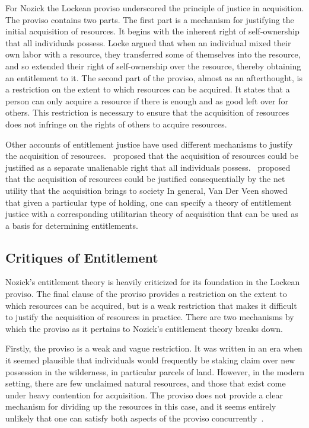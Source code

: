 For Nozick the Lockean proviso underscored the principle of justice in
acquisition. The proviso contains two parts. The first part is a mechanism for 
justifying the initial acquisition of resources. It begins with the inherent 
right of self-ownership that all individuals possess. Locke argued that when 
an individual mixed their own labor with a resource, they transferred some of 
themselves into the resource, and so extended their right of self-ownership over 
the resource, thereby obtaining an entitlement to it. The second part of the
proviso, almost as an afterthought, is a restriction on the extent to which 
resources can be acquired. It states that a person can only acquire a resource
if there is enough and as good left over for others. This restriction is
necessary to ensure that the acquisition of resources does not infringe on the
rights of others to acquire resources.

Other accounts of entitlement justice have used different mechanisms to justify
the acquisition of resources.~\citep{Mack_1990} proposed that the acquisition of
resources could be justified as a separate unalienable right that all
individuals possess.~\citep{Van_der_Veen_1985} proposed that the acquisition of
resources could be justified consequentially by the net utility that the
acquisition brings to society In general, Van Der Veen showed that given a
particular type of holding, one can specify a theory of entitlement justice with
a corresponding utilitarian theory of acquisition that can be used as a basis
for determining entitlements.

\subsection{Critiques of Entitlement}

Nozick's entitlement theory is heavily criticized for its foundation in the
Lockean proviso. The final clause of the proviso provides a restriction on the
extent to which resources can be acquired, but is a weak restriction that makes
it difficult to justify the acquisition of resources in practice. There are two 
mechanisms by which the proviso as it pertains to Nozick's entitlement theory 
breaks down.

Firstly, the proviso is a weak and vague restriction. It was written in an era 
when it seemed plausible that individuals would frequently be staking claim over
new possession in the wilderness, in particular parcels of land. However, in the
modern setting, there are few unclaimed natural resources, and those that exist
come under heavy contention for acquisition. The proviso does not provide a
clear mechanism for dividing up the resources in this case, and it seems
entirely unlikely that one can satisfy both aspects of the proviso
concurrently~\citep{Fried_2004}.


